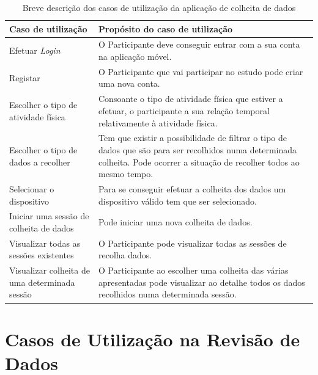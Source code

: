 \begin{table}[H]
\centering

\begin{tabularx}{1\textwidth}{|p{4cm}|p{10.7cm}|}
\rowcolor[HTML]{FFCE93} \hline
\textbf{Caso de utilização} &  \textbf{Propósito do caso de utilização}  \\
\hline
Efetuar \textit{Login}  & O Participante deve conseguir entrar com a sua conta na aplicação móvel. \\ \hline

Registar & O Participante que vai participar no estudo pode criar uma nova  conta. \\ \hline

Escolher o tipo de atividade física & Consoante o tipo de atividade física que estiver a efetuar, o participante a sua relação temporal relativamente à atividade física.\\ \hline

Escolher o tipo de dados a recolher & Tem que existir a possibilidade de filtrar o tipo de dados que são para ser recolhidos numa determinada colheita. Pode ocorrer a situação de recolher todos ao mesmo tempo. \\ \hline

Selecionar o dispositivo  & Para se conseguir efetuar a colheita dos dados um dispositivo válido tem que ser selecionado. \\ \hline

Iniciar uma sessão de colheita de dados & Pode iniciar uma nova colheita de dados. \\ \hline

Visualizar todas as sessões existentes & O Participante pode visualizar todas as sessões de recolha dados. \\ \hline

Visualizar colheita de uma determinada sessão & O Participante ao escolher uma colheita das várias apresentadas pode visualizar ao detalhe todos os dados recolhidos numa determinada sessão. \\ \hline    

\end{tabularx}

\caption{Breve descrição dos casos de utilização da aplicação de colheita de dados}
\label{t:android-usecase}
\end{table}

\section{Casos de Utilização na Revisão de Dados}

